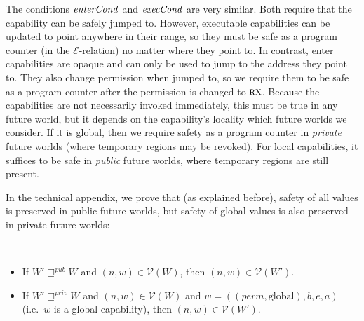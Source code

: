 \documentclass{llncs}
\newcommand{\var}[1]{\mathit{#1}}
\newcommand{\gl}{\var{g}}
\newcommand{\addr}{\var{a}}
\newcommand{\start}{\var{b}}
\newcommand{\addrend}{\var{e}}
\newcommand{\perm}{\var{perm}}
\newcommand{\stdcap}[1][(\perm,\gl)]{\left(#1,\start,\addrend,\addr \right)}
\newcommand{\plainfun}[2]{
  \ifthenelse{\equal{#2}{}}
  {\mathit{#1}}
  {\mathit{#1}(#2)}
}
\newcommand{\execCond}[1]{\plainfun{execCond}{#1}}
\newcommand{\entryCond}[1]{\plainfun{enterCond}{#1}}
\newcommand{\futurewk}{\mathbin{\sqsupseteq}^{\var{pub}}}
\newcommand{\futurestr}{\mathbin{\sqsupseteq}^{\var{priv}}}
\newcommand{\asmType}{\plaindom{AsmType}}
\newcommand{\plaindom}[1]{\mathrm{#1}}
\newcommand{\intr}[2]{\mathcal{#1}}
\newcommand{\valueintr}[1]{\intr{V}{#1}}
\newcommand{\exprintr}[1]{\intr{E}{#1}}
\newcommand{\stdvr}{\valueintr{\asmType}}
\newcommand{\stder}{\exprintr{\asmType}}
\newcommand{\npair}[2][n]{\left(#1,#2 \right)}
\newcommand{\plainperm}[1]{\textsc{#1}}
\newcommand{\exec}{\plainperm{rx}}
\newcommand{\plainlocality}[1]{\mathrm{#1}}
\newcommand{\glob}{\plainlocality{global}}
\begin{document}
The conditions $\entryCond{}$ and $\execCond{}$ are very similar. Both require
that the capability can be safely jumped to. However, executable capabilities
can be updated to point anywhere in their range, so they must be safe as a
program counter (in the $\stder$-relation) no matter where they point to. In
contrast, enter capabilities are opaque and can only be used to jump to the
address they point to. They also change permission when jumped to, so we require
them to be safe as a program counter after the permission is changed to $\exec$.
Because the capabilities are not necessarily invoked immediately, this must be
true in any future world, but it depends on the capability's locality which
future worlds we consider. If it is global, then we require safety as a program
counter in \emph{private} future worlds (where temporary regions may be
revoked). For local capabilities, it suffices to be safe in \emph{public} future
worlds, where temporary regions are still present.

In the technical appendix, we prove that (as explained before), safety of all
values is preserved in public future worlds, but safety of global values is
also preserved in private future worlds:
\begin{lemma}~
  \begin{itemize}
  \item If $W' \futurewk W$ and $\npair{w} \in \stdvr(W)$, then $\npair{w} \in
    \stdvr(W')$.
  \item If $W' \futurestr W$ and $\npair{w} \in \stdvr(W)$ and $w =
    \stdcap[(\perm,\glob)]$ (i.e.\ $w$ is a global capability), then $\npair{w}
    \in \stdvr(W')$.
  \end{itemize}
\end{lemma}
\end{document}

